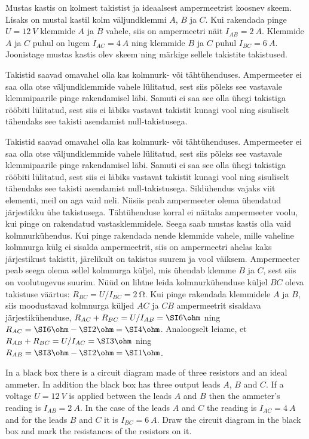 
Mustas kastis on kolmest takistist ja ideaalsest ampermeetrist koosnev skeem. Lisaks on mustal kastil kolm väljundklemmi $A$, $B$ ja $C$. Kui rakendada pinge $U=\SI{12}{V}$ klemmide $A$ ja $B$ vahele, siis on ampermeetri näit $I_{AB}=\SI{2}{A}$. Klemmide $A$ ja $C$ puhul on lugem $I_{AC}=\SI{4}{A}$ ning klemmide $B$ ja $C$ puhul $I_{BC}=\SI{6}{A}$. Joonistage mustas kastis olev skeem ning märkige sellele takistite takistused.

\hint
Takistid saavad omavahel olla kas kolmnurk- või tähtühenduses. Ampermeeter ei saa olla otse väljundklemmide vahele lülitatud, sest siis põleks see vastavale klemmipaarile pinge rakendamisel läbi. Samuti ei saa see olla ühegi takistiga rööbiti lülitatud, sest siis ei läbiks vastavat takistit kunagi vool ning sisuliselt tähendaks see takisti asendamist null-takistusega.

\solu
Takistid saavad omavahel olla kas kolmnurk- või tähtühenduses. Ampermeeter ei saa olla otse väljundklemmide vahele lülitatud, sest siis põleks see vastavale klemmipaarile pinge rakendamisel läbi. Samuti ei saa see olla ühegi takistiga rööbiti lülitatud, sest siis ei läbiks vastavat takistit kunagi vool ning sisuliselt tähendaks see takisti asendamist null-takistusega. Sildühendus vajaks viit elementi, meil on aga vaid neli. Niisiis peab ampermeeter olema ühendatud järjestikku ühe takistusega. Tähtühenduse korral ei näitaks ampermeeter voolu, kui pinge on rakendatud vastasklemmidele. Seega saab mustas kastis olla vaid kolmnurkühendus. Kui pinge rakendada nende klemmide vahele, mille vaheline kolmnurga külg ei sisalda ampermeetrit, siis on ampermeetri ahelas kaks järjestikust takistit, järelikult on takistus suurem ja vool väiksem. Ampermeeter peab seega olema sellel kolmnurga küljel, mis ühendab klemme $B$ ja $C$, sest siis on voolutugevus suurim. Nüüd on lihtne leida kolmnurkühenduse küljel $BC$ oleva 
takistuse väärtus: $R_{BC}=U/I_{BC}=\SI{2}{\ohm}$. Kui pinge rakendada klemmidele $A$ ja $B$, siis moodustavad kolmnurga küljed $AC$ ja $CB$
ampermeetrit sisaldava järjestikühenduse, $R_{AC}+R_{BC}=U/I_{AB}=\SI 6\ohm$ ning $R_{AC}=\SI 6\ohm-\SI 2\ohm=\SI 4\ohm$.
Analoogselt leiame, et $R_{AB}+R_{BC}=U/I_{AC}=\SI 3\ohm$ ning $R_{AB}=\SI 3\ohm-\SI 2\ohm=\SI 1\ohm$.

In a black box there is a circuit diagram made of three resistors and an ideal ammeter. In addition the black box has three output leads $A$, $B$ and $C$. If a voltage $U=\SI{12}{V}$ is applied between the leads $A$ and $B$ then the ammeter’s reading is $I_{AB}=\SI{2}{A}$. In the case of the leads $A$ and $C$ the reading is $I_{AC}=\SI{4}{A}$ and for the leads $B$ and $C$ it is $I_{BC}=\SI{6}{A}$. Draw the circuit diagram in the black box and mark the resistances of the resistors on it.


